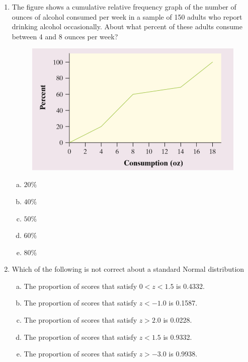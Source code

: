 \documentclass[a4paper,12pt,twoside]{book}
\begin{document}
\begin{itemize}
\begin{enumerate}
   \item The figure shows a cumulative relative frequency graph of the number of ounces of alcohol consumed per week in a sample of 150 adults who report drinking alcohol occasionally. About what percent of these adults consume between 4 and 8 ounces per week?
   
     \begin{figure}[H]
         \centering
         \includegraphics[scale=0.5]{figure14}
     \end{figure}
     
     \begin{multicols}{5}
         \begin{enumerate}[(a)]
             \item $20\%$
             \item $40\%$
             \item $50\%$
             \item $60\%$
             \item $80\%$
         \end{enumerate}
     \end{multicols}
     
  \item Which of the following is not correct about a standard Normal distribution
   
   \begin{enumerate}[(a)]
       \item  The proportion of scores that satisfy $0 < z < 1.5$ is 0.4332.
       \item The proportion of scores that satisfy $z < −1.0$ is 0.1587.
       \item  The proportion of scores that satisfy $z > 2.0$ is 0.0228.
       \item The proportion of scores that satisfy $z < 1.5$ is 0.9332.
       \item The proportion of scores that satisfy $z > −3.0$ is 0.9938.
   \end{enumerate}
   \vspace{0.3cm}  
   

\end{enumerate}
\end{itemize}
\end{document}

